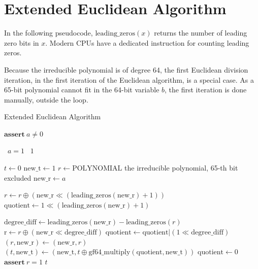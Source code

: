 \appendix
\appendixpage
\renewcommand{\thesection}{A.\arabic{section}}
\addappheadtotoc

\section{Extended Euclidean Algorithm}
\label{appendix:euclidean}

In the following pseudocode, $\text{leading\_zeros}(x)$ returns the number of leading zero bits in $x$.
Modern CPUs have a dedicated instruction for counting leading zeros.

Because the irreducible polynomial is of degree 64, the first Euclidean division iteration, in the first iteration of the Euclidean algorithm, is a special case.
As a 65-bit polynomial cannot fit in the 64-bit variable $b$, the first iteration is done manually, outside the loop.

\begin{algorithm}
\caption{Extended Euclidean Algorithm}
\begin{algorithmic}

\State $\textbf{assert}\ a \neq 0$

\State \algorithmicif\ $a = 1$ \algorithmicthen\ \Return $1$ \algorithmicend \algorithmicif

\State $t \gets 0$
\State $\text{new\_t} \gets 1$
\State $r \gets \text{POLYNOMIAL}$ \Comment the irreducible polynomial, 65-th bit excluded
    \State $\text{new\_r} \gets a$

\State $r \gets r \oplus (\text{new\_r} \ll (\text{leading\_zeros}(\text{new\_r}) + 1))$
\State $\text{quotient} \gets 1 \ll (\text{leading\_zeros}(\text{new\_r}) + 1)$

        \State $\text{degree\_diff} \gets \text{leading\_zeros}(\text{new\_r}) - \text{leading\_zeros}(r)$
        \State $\text{r} \gets r \oplus (\text{new\_r} \ll \text{degree\_diff})$
        \State $\text{quotient} \gets \text{quotient} | (1 \ll \text{degree\_diff})$
    \EndWhile
    \State $(r, \text{new\_r}) \gets (\text{new\_r}, r)$
    \State $(t, \text{new\_t}) \gets (\text{new\_t}, t \oplus \text{gf64\_multiply}(\text{quotient}, \text{new\_t}))$
    \State $\text{quotient} \gets 0$
\EndWhile
\State $\textbf{assert}\ r = 1$
\State \Return $t$
\EndFunction
\end{algorithmic}
\end{algorithm}

